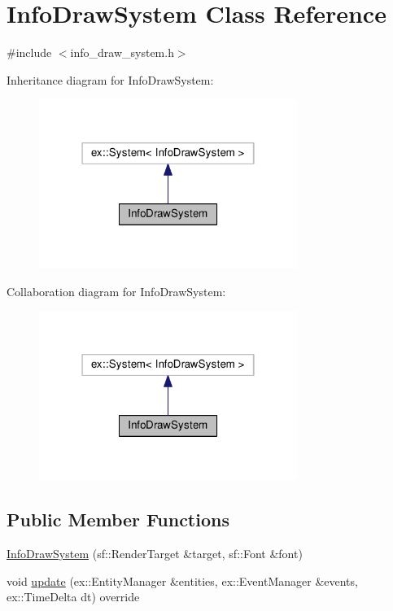 \hypertarget{classInfoDrawSystem}{}\section{Info\+Draw\+System Class Reference}
\label{classInfoDrawSystem}


{\ttfamily \#include $<$info\+\_\+draw\+\_\+system.\+h$>$}



Inheritance diagram for Info\+Draw\+System\+:
\nopagebreak
\begin{figure}[H]
\begin{center}
\leavevmode
\includegraphics[width=238pt]{classInfoDrawSystem__inherit__graph}
\end{center}
\end{figure}


Collaboration diagram for Info\+Draw\+System\+:
\nopagebreak
\begin{figure}[H]
\begin{center}
\leavevmode
\includegraphics[width=238pt]{classInfoDrawSystem__coll__graph}
\end{center}
\end{figure}
\subsection*{Public Member Functions}
\begin{DoxyCompactItemize}
\item 
\hyperlink{classInfoDrawSystem_a6ddca785e40f494d5973a8b957a76873}{Info\+Draw\+System} (sf\+::\+Render\+Target \&target, sf\+::\+Font \&font)
\item 
void \hyperlink{classInfoDrawSystem_aac0a0e5f1595857ca8ab47c17ea3e62e}{update} (ex\+::\+Entity\+Manager \&entities, ex\+::\+Event\+Manager \&events, ex\+::\+Time\+Delta dt) override
\end{DoxyCompactItemize}



